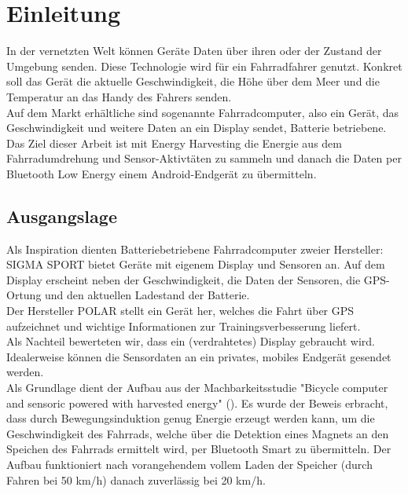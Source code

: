 \chapter{Einleitung}
In der vernetzten Welt können Geräte Daten über ihren oder der Zustand der Umgebung senden. Diese Technologie wird für ein Fahrradfahrer genutzt. Konkret soll das Gerät die aktuelle Geschwindigkeit, die Höhe über dem Meer und die Temperatur an das Handy des Fahrers senden.\\

Auf dem Markt erhältliche sind sogenannte Fahrradcomputer, also ein Gerät, das Geschwindigkeit und weitere Daten an ein Display sendet, Batterie betriebene. Das Ziel dieser Arbeit ist mit Energy Harvesting die Energie aus dem Fahrradumdrehung und Sensor-Aktivtäten zu sammeln und danach die Daten per Bluetooth Low Energy einem Android-Endgerät zu übermitteln.


\section{Ausgangslage}

Als Inspiration dienten Batteriebetriebene Fahrradcomputer zweier Hersteller:\\ 
SIGMA SPORT bietet Geräte mit eigenem Display und  Sensoren an. Auf dem Display erscheint neben der Geschwindigkeit, die Daten der Sensoren, die GPS-Ortung und den aktuellen Ladestand der Batterie.\\ 
Der Hersteller POLAR stellt ein Gerät her, welches die Fahrt über GPS aufzeichnet und wichtige Informationen zur Trainingsverbesserung liefert.\\
Als Nachteil bewerteten wir, dass ein (verdrahtetes) Display gebraucht wird. Idealerweise können die Sensordaten an ein privates, mobiles Endgerät gesendet werden.\\




Als Grundlage dient der Aufbau aus der Machbarkeitsstudie "Bicycle computer and sensoric powered with harvested energy" (\cite{PA_bicycle}). Es wurde der Beweis erbracht, dass durch Bewegungsinduktion genug Energie erzeugt werden kann, um die Geschwindigkeit des Fahrrads, welche über die Detektion eines Magnets an den Speichen des Fahrrads ermittelt wird, per Bluetooth Smart zu übermitteln. Der Aufbau funktioniert nach vorangehendem vollem Laden der Speicher (durch Fahren bei 50 km/h) danach zuverlässig bei 20 km/h. \\

